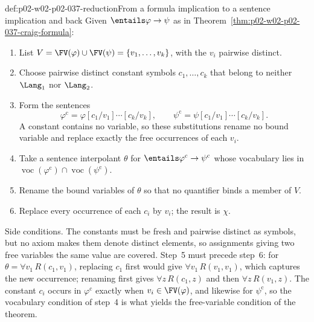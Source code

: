 \begin{hbmethod}{def:p02-w02-p02-037-reduction}{From a formula implication to a sentence implication and back}
Given \(\entails\varphi\to\psi\) as in
Theorem~\ref{thm:p02-w02-p02-037-craig-formula}:
\begin{enumerate}
 \item List \(V=\FV(\varphi)\cup\FV(\psi)=\{v_1,\ldots,v_k\}\), with the
       \(v_i\) pairwise distinct.
 \item Choose pairwise distinct constant symbols \(c_1,\ldots,c_k\) that
       belong to neither \(\Lang_1\) nor \(\Lang_2\).
 \item Form the sentences
       \[
        \varphi^{\mathrm{c}}=\varphi[c_1/v_1]\cdots[c_k/v_k],
        \qquad
        \psi^{\mathrm{c}}=\psi[c_1/v_1]\cdots[c_k/v_k].
       \]
       A constant contains no
       variable, so these substitutions rename no bound variable and
       replace exactly the free occurrences of each \(v_i\).
 \item Take a sentence interpolant \(\theta\) for
       \(\entails\varphi^{\mathrm{c}}\to\psi^{\mathrm{c}}\) whose vocabulary lies in
       \(\operatorname{voc}(\varphi^{\mathrm{c}})\cap\operatorname{voc}(\psi^{\mathrm{c}})\).
 \item Rename the bound variables of \(\theta\) so that no quantifier binds
       a member of \(V\).
 \item Replace every occurrence of each \(c_i\) by \(v_i\); the result is
       \(\chi\).
\end{enumerate}
Side conditions.  The constants must be fresh and pairwise distinct as
symbols, but no axiom makes them denote distinct elements, so assignments
giving two free variables the same value are covered.  Step~5 must precede
step~6: for \(\theta=\forall v_1\,R(c_1,v_1)\), replacing \(c_1\) first
would give \(\forall v_1\,R(v_1,v_1)\), which captures the new occurrence;
renaming first gives \(\forall z\,R(c_1,z)\) and then
\(\forall z\,R(v_1,z)\).  The constant \(c_i\) occurs in
\(\varphi^{\mathrm{c}}\) exactly when \(v_i\in\FV(\varphi)\), and likewise for
\(\psi^{\mathrm{c}}\), so the vocabulary condition of step~4 is what yields the
free-variable condition of the theorem.
\end{hbmethod}

